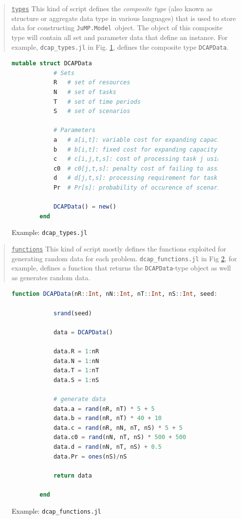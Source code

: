 \documentclass{hitec}
\newcommand{\jumpmodel}{\texttt{JuMP.Model}}
\begin{document}
	\begin{quote}
		\noindent\underline{\texttt{types}} This kind of script defines the \textit{composite type} (also known as structure or aggregate data type in various languages) that is used to store data for constructing \jumpmodel\ object. The object of this composite type will contain all set and parameter data that define an instance. For example, \texttt{dcap\_types.jl} in Fig. \ref{fig:dcap_types}, defines the composite type \texttt{DCAPData}.
	\end{quote}
	\begin{figure}[H]
		\centering
		\begin{lstlisting}[frame=single,language=julia]
		mutable struct DCAPData
			# Sets
			R   # set of resources 
			N   # set of tasks 
			T   # set of time periods 
			S   # set of scenarios 
			
			# Parameters
			a   # a[i,t]: variable cost for expanding capacity of resource i at time t
			b   # b[i,t]: fixed cost for expanding capacity of resource i at time t
			c   # c[i,j,t,s]: cost of processing task j using resource i in period t under scenario s
			c0  # c0[j,t,s]: penalty cost of failing to assign a resource to task j under scenario s
			d   # d[j,t,s]: processing requirement for task j in period t under scenario s
			Pr  # Pr[s]: probability of occurence of scenario s
			
			DCAPData() = new()
		end
		\end{lstlisting}
		\caption{Example: \texttt{dcap\_types.jl}}\label{fig:dcap_types}
	\end{figure}
	
	\begin{quote}
		\noindent\underline{\texttt{functions}} This kind of script mostly defines the functions exploited for generating random data for each problem. \texttt{dcap\_functions.jl} in Fig \ref{fig:dcap_functions}, for example, defines a function that returns the \texttt{DCAPData}-type object as well as generates random data.
	\end{quote}
	\begin{figure}[H]
		\centering
		\begin{lstlisting}[frame=single,language=julia]
		function DCAPData(nR::Int, nN::Int, nT::Int, nS::Int, seed::Int=1)::DCAPData
		
			srand(seed)
			
			data = DCAPData()
			
			data.R = 1:nR
			data.N = 1:nN
			data.T = 1:nT
			data.S = 1:nS
			
			# generate data
			data.a = rand(nR, nT) * 5 + 5
			data.b = rand(nR, nT) * 40 + 10
			data.c = rand(nR, nN, nT, nS) * 5 + 5
			data.c0 = rand(nN, nT, nS) * 500 + 500
			data.d = rand(nN, nT, nS) + 0.5
			data.Pr = ones(nS)/nS
			
			return data
		
		end
		\end{lstlisting}
		\caption{Example: \texttt{dcap\_functions.jl}}\label{fig:dcap_functions}
	\end{figure}
	
\end{document}
